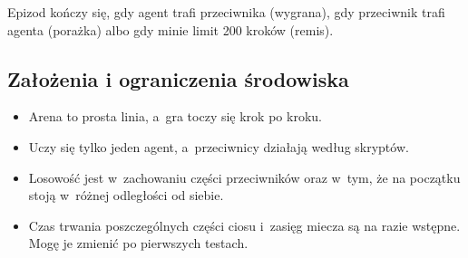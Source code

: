 \documentclass[12pt]{article}
\begin{document}
Epizod kończy się, gdy agent trafi przeciwnika (wygrana), gdy przeciwnik trafi agenta (porażka) albo gdy minie limit 200 kroków (remis).

\subsection{Założenia i ograniczenia środowiska}

\begin{itemize}
    \item Arena to prosta linia, a~gra toczy się krok po kroku.
    \item Uczy się tylko jeden agent, a~przeciwnicy działają według skryptów.
    \item Losowość jest w~zachowaniu części przeciwników oraz w~tym, że na początku stoją w~różnej odległości od siebie.
    \item Czas trwania poszczególnych części ciosu i~zasięg miecza są na razie wstępne. Mogę je zmienić po pierwszych testach.
\end{itemize}








\end{document}
